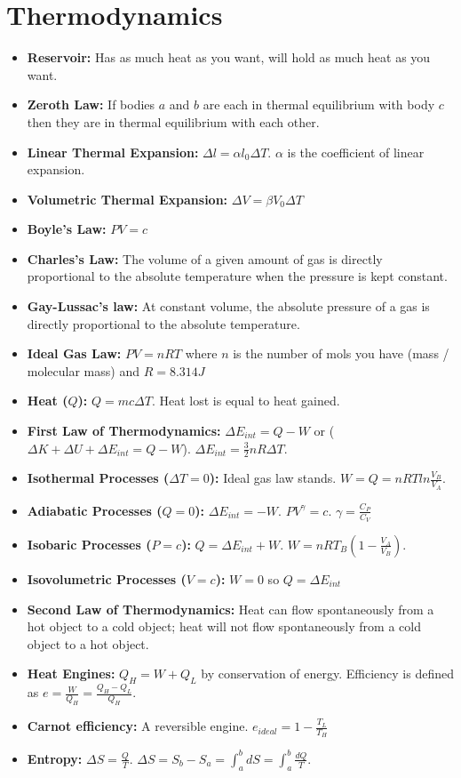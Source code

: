 \documentclass{article}
\begin{document}
\section{Thermodynamics} %
\label{sec:Thermodynamics}
\begin{itemize}
  \item \textbf{Reservoir:} Has as much heat as you want, will hold as much heat as you want.
  \item \textbf{Zeroth Law:} If bodies $a$ and $b$ are each in thermal equilibrium with body $c$ then they are in thermal equilibrium with each other.
  \item \textbf{Linear Thermal Expansion:} $\Delta l = \alpha l_0 \Delta T$. $\alpha$ is the coefficient of linear expansion.
  \item \textbf{Volumetric Thermal Expansion:} $\Delta V = \beta V_0 \Delta T$
  \item \textbf{Boyle's Law:} $PV = c$
  \item \textbf{Charles's Law:} The volume of a given amount of gas is directly proportional to the absolute temperature when the pressure is kept constant.
  \item \textbf{Gay-Lussac's law:} At constant volume, the absolute pressure of a gas is directly proportional to the absolute temperature.
  \item \textbf{Ideal Gas Law:} $PV = nRT$ where $n$ is the number of mols you have (mass / molecular mass) and $R = 8.314J$
  \item \textbf{Heat ($Q$):} $Q = mc \Delta T$. Heat lost is equal to heat gained.
  \item \textbf{First Law of Thermodynamics:} $\Delta E_{int} = Q - W$ or ($\Delta K + \Delta U + \Delta E_{int} = Q - W$). $\Delta E_{int} = \frac{3}{2}nR \Delta T$.
  \item \textbf{Isothermal Processes ($\Delta T = 0$):} Ideal gas law stands. $W = Q = nRT ln \frac{V_B}{V_A}$.
  \item \textbf{Adiabatic Processes ($Q=0$):} $\Delta E_{int} = -W$. $PV^\gamma = c$. $\gamma = \frac{C_P}{C_V}$
  \item \textbf{Isobaric Processes ($P=c$):} $Q = \Delta E_{int} + W$. $W = nRT_B (1 - \frac{V_A}{V_B})$.
  \item \textbf{Isovolumetric Processes ($V=c$):} $W=0$ so $Q = \Delta E_{int}$
  \item \textbf{Second Law of Thermodynamics:} Heat can flow spontaneously from a hot object to a cold object; heat will not flow spontaneously from a cold object to a hot object.
  \item \textbf{Heat Engines:} $Q_H = W + Q_L$ by conservation of energy. Efficiency is defined as $e = \frac{W}{Q_H} = \frac{Q_H - Q_L}{Q_H}$.
  \item \textbf{Carnot efficiency:} A reversible engine. $e_{ideal} = 1 - \frac{T_L}{T_H}$
  \item \textbf{Entropy:} $\Delta S = \frac{Q}{T}$. $\Delta S = S_b - S_a = \int_a^b dS = \int_a^b \frac{dQ}{T}$.
\end{itemize}

\end{document}

